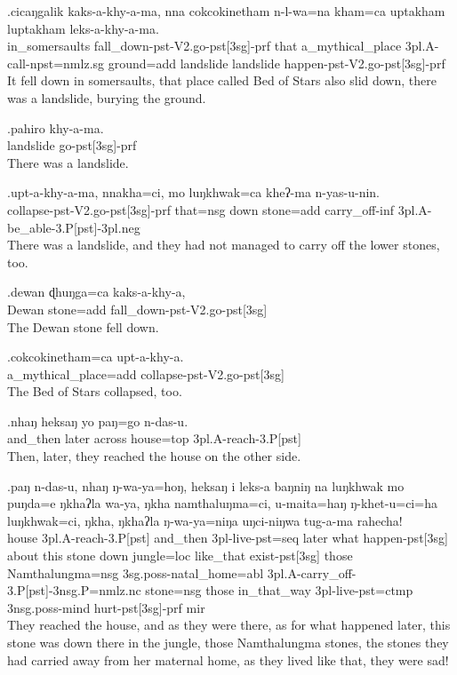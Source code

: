 \exg.cicaŋgalik   kaks-a-khy-a-ma, nna  cokcokinetham  n-l-wa=na   kham=ca  uptakham  luptakham leks-a-khy-a-ma.\\
in\_somersaults fall\_down{\sc -pst-V2.go-pst[3sg]-prf} that a\_mythical\_place {\sc 3pl.A-}call{\sc -npst=nmlz.sg} ground{\sc =add} landslide landslide happen{\sc -pst-V2.go-pst[3sg]-prf}\\
It fell down in somersaults, that place called Bed of Stars also slid down, there was a landslide, burying the ground.

\exg.pahiro  khy-a-ma.\\
landslide go{\sc -pst[3sg]-prf}\\
There was a landslide.

\exg.upt-a-khy-a-ma,    nnakha=ci,  mo luŋkhwak=ca  kheʔ-ma  n-yas-u-nin.\\
collapse{\sc -pst-V2.go-pst[3sg]-prf} that{\sc =nsg} down stone{\sc =add} carry\_off{\sc -inf} {\sc 3pl.A-}be\_able{\sc -3.P[pst]-3pl.neg}\\
There was a landslide, and they had not managed to carry off the lower stones, too.

\exg.dewan  ɖhuŋga=ca  kaks-a-khy-a,\\
Dewan stone{\sc =add} fall\_down{\sc -pst-V2.go-pst[3sg]}\\
The Dewan stone fell down.

\exg.cokcokinetham=ca   upt-a-khy-a.\\
a\_mythical\_place{\sc =add} collapse{\sc -pst-V2.go-pst[3sg]}\\
The Bed of Stars collapsed, too.

\exg.nhaŋ  heksaŋ yo paŋ=go  n-das-u.\\
and\_then later across house{\sc =top}  {\sc 3pl.A-}reach{\sc -3.P[pst]}\\
Then, later, they reached the house on the other side.

\exg.paŋ  n-das-u,   nhaŋ  ŋ-wa-ya=hoŋ, heksaŋ i  leks-a  baŋniŋ na luŋkhwak mo puŋda=e ŋkhaʔla wa-ya,  ŋkha namthaluŋma=ci, u-maita=haŋ   ŋ-khet-u=ci=ha     luŋkhwak=ci, ŋkha, ŋkhaʔla ŋ-wa-ya=niŋa   uŋci-niŋwa tug-a-ma  rahecha!\\
house {\sc 3pl.A-}reach{\sc -3.P[pst]} and\_then {\sc 3pl-}live{\sc -pst=seq} later what happen{\sc -pst[3sg]} about this stone down jungle{\sc =loc} like\_that exist{\sc -pst[3sg]} those Namthalungma{\sc =nsg} {\sc 3sg.poss-}natal\_home{\sc =abl} {\sc 3pl.A-}carry\_off{\sc -3.P[pst]-3nsg.P=nmlz.nc} stone{\sc =nsg} those in\_that\_way {\sc 3pl-}live{\sc -pst=ctmp} {\sc 3nsg.poss-}mind hurt{\sc -pst[3sg]-prf} {\sc mir}\\
They reached the house, and as they were there,  as for what happened later, this stone was down there in the jungle, those Namthalungma stones, the stones they had carried away from her maternal
home, as they lived like that, they were sad!

